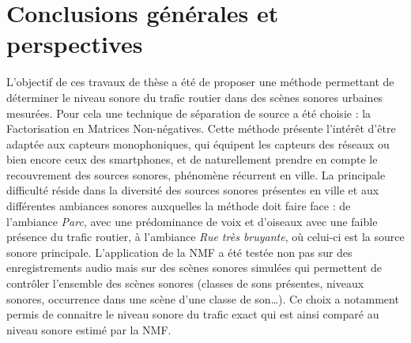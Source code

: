 \chapter*{Conclusions générales et perspectives}
\label{chap:concl}


L'objectif de ces travaux de thèse a été de proposer une méthode permettant de déterminer le niveau sonore du trafic routier dans des scènes sonores urbaines mesurées. Pour cela une technique de séparation de source a été choisie : la Factorisation en Matrices Non-négatives.
Cette méthode présente l'intérêt d'être adaptée aux capteurs monophoniques, qui équipent les capteurs des réseaux ou bien encore ceux des smartphones, et de naturellement prendre en compte le recouvrement des sources sonores, phénomène récurrent en ville. 
La principale difficulté réside dans la diversité des sources sonores présentes en ville et aux différentes ambiances sonores auxquelles la méthode doit faire face : de l'ambiance \textit{Parc}, avec une prédominance de voix et d'oiseaux avec une faible présence du trafic routier, à l'ambiance \textit{Rue très bruyante}, où celui-ci est la source sonore principale.
L'application de la NMF a été testée non pas sur des enregistrements audio mais sur des scènes sonores simulées qui permettent de contrôler l'ensemble des scènes sonores (classes de sons présentes, niveaux sonores, occurrence dans une scène d'une classe de son\dots). Ce choix a notamment permis de connaitre le niveau sonore du trafic exact qui est ainsi comparé au niveau sonore estimé par la NMF. 

